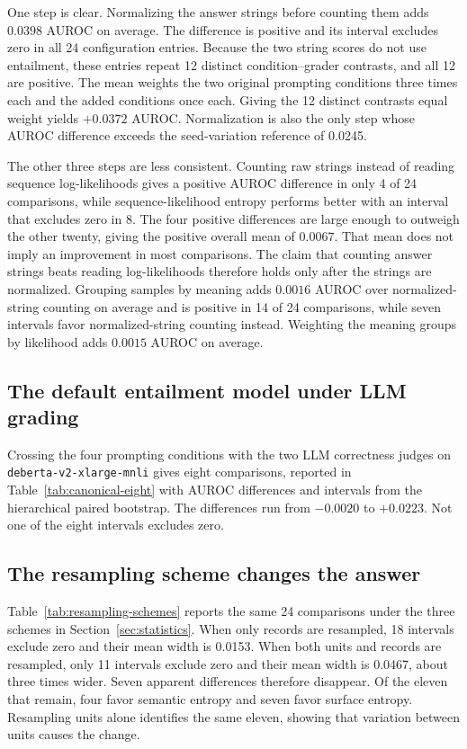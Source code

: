 One step is clear. Normalizing the answer strings before counting them adds
$0.0398$ AUROC on average. The difference is positive and its interval excludes
zero in all 24 configuration entries. Because the two string scores do not
use entailment, these entries repeat 12 distinct condition--grader contrasts,
and all 12 are positive. The mean weights the two original prompting conditions
three times each and the added conditions once each. Giving the 12 distinct
contrasts equal weight yields $+0.0372$ AUROC. Normalization is also the only step whose AUROC difference
exceeds the seed-variation reference of 0.0245.

The other three steps are less consistent. Counting raw strings instead of
reading sequence log-likelihoods gives a positive AUROC difference in only 4 of
24 comparisons, while sequence-likelihood entropy performs better with an interval
that excludes zero in 8. The four positive differences are large enough to
outweigh the other twenty, giving the positive overall mean of $0.0067$.
That mean does not imply an improvement in most comparisons.
The claim that counting answer strings beats reading
log-likelihoods therefore holds only after the strings are normalized.
Grouping samples by meaning adds $0.0016$ AUROC over \mbox{normalized-string} counting
on average and is positive in 14 of 24 comparisons, while seven intervals favor
normalized-string counting instead. Weighting the meaning groups by likelihood
adds $0.0015$ AUROC on average.

\subsection{The default entailment model under LLM grading}

Crossing the four prompting conditions with the two LLM correctness judges on
\texttt{deberta-v2-xlarge-mnli} gives eight comparisons, reported in
Table~\ref{tab:canonical-eight} with AUROC differences and intervals from the
hierarchical paired bootstrap. The differences run
from $-0.0020$ to $+0.0223$. Not one of
the eight intervals excludes zero.



\subsection{The resampling scheme changes the answer}

Table~\ref{tab:resampling-schemes} reports the same 24 comparisons under the
three schemes in Section~\ref{sec:statistics}. When only records are resampled,
18 intervals exclude zero and their mean width is 0.0153. When both units and
records are resampled, only 11 intervals exclude zero and their mean width is
0.0467, about three times wider. Seven apparent differences therefore
disappear. Of the eleven that remain, four favor semantic entropy and seven
favor surface entropy. Resampling units alone identifies the same eleven,
showing that variation between units causes the change.

